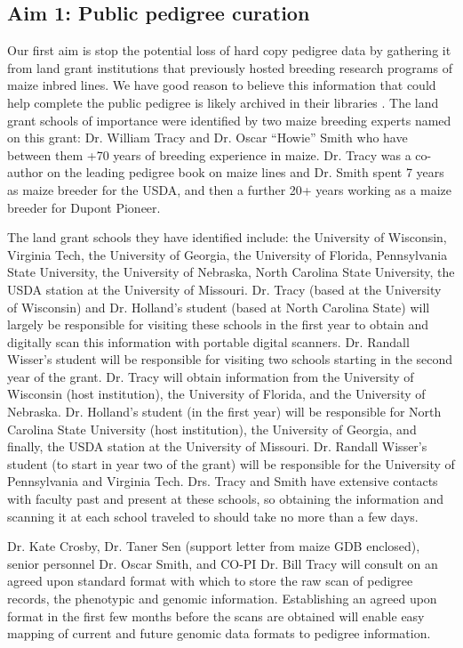 \documentclass[final,12pt]{article}
\begin{document}
\subsection*{Aim 1: Public pedigree curation}
Our first aim is  stop the potential loss of hard copy pedigree data by gathering it from land grant institutions that previously hosted breeding research programs of maize inbred lines. 
We have good reason to believe this information that could help complete the public pedigree is likely archived in their libraries . 
The land grant schools of importance were identified by two maize breeding experts named on this grant: Dr. William Tracy and Dr. Oscar ``Howie'' Smith who have between them +70 years of breeding experience in maize. 
Dr. Tracy was a co-author on the leading pedigree book on maize lines \cite{gerdes1993compilation} and Dr. Smith spent 7 years as maize breeder for the USDA, and then a further 20+ years working as a maize breeder for Dupont Pioneer.

The land grant schools they have identified include: the University of Wisconsin, Virginia Tech, the University of Georgia, the University of Florida, Pennsylvania State University, the University of Nebraska, North Carolina State University, the USDA station at the University of Missouri. 
Dr. Tracy (based at the University of Wisconsin) and Dr. Holland's student (based at North Carolina State) will largely be responsible for visiting these schools in the first year to obtain and digitally scan this information with portable digital scanners. 
Dr. Randall Wisser's student will be responsible for visiting two schools starting in the second year of the grant.
Dr. Tracy will obtain information from the University of Wisconsin (host institution), the University of Florida, and the University of Nebraska. 
Dr. Holland's student (in the first year) will be responsible for North Carolina State University (host institution), the University of Georgia, and finally, the USDA station at the University of Missouri. 
Dr. Randall Wisser's student (to start in year two of the grant) will be responsible for the University of Pennsylvania and Virginia Tech.
Drs. Tracy and Smith have extensive contacts with faculty past and present at these schools, so obtaining the information and scanning it at each school traveled to should take no more than a few days. 

Dr. Kate Crosby, Dr. Taner Sen (support letter from maize GDB enclosed), senior personnel Dr. Oscar Smith, and CO-PI Dr. Bill Tracy will consult on an agreed upon standard format with which to store the raw scan of pedigree records, the phenotypic and genomic information. 
Establishing an agreed upon format in the first few months before the scans are obtained will enable easy mapping of current and future genomic data formats to pedigree information.
\end{document}
